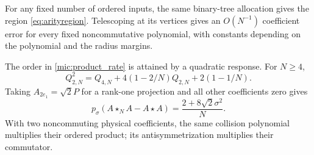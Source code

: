 \documentclass[11pt,a4paper]{amsart}
\numberwithin{equation}{section}
\theoremstyle{definition}
\theoremstyle{remark}
\begin{document}
For any fixed number of ordered inputs, the same binary-tree allocation gives the region \eqref{eq:arityregion}. Telescoping at its vertices gives an $O(N^{-1})$ coefficient error for every fixed noncommutative polynomial, with constants depending on the polynomial and the radius margins.

The order in \eqref{mic:product_rate} is attained by a quadratic response. For $N\ge4$,
\begin{equation}\label{mic:quadratic}
 Q_{2,N}^2=Q_{4,N}+4(1-2/N)Q_{2,N}+2(1-1/N).
\end{equation}
Taking $A_{2e_1}=\sqrt2P$ for a rank-one projection and all other coefficients zero gives
\begin{equation}\label{mic:sharp_rate}
 p_\sigma(A\star_NA-A\star A)=\frac{2+8\sqrt2\sigma^2}{N}.
\end{equation}
With two noncommuting physical coefficients, the same collision polynomial multiplies their ordered product; its antisymmetrization multiplies their commutator.
\end{document}
